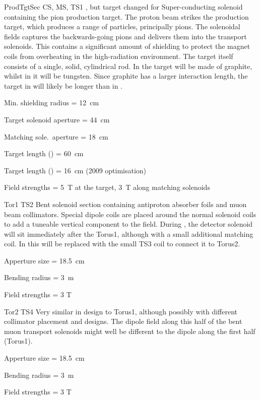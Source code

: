 {ProdTgtSec}
{CS, MS, TS1}
{\phaseI, but target changed for \phaseII}
{Super-conducting solenoid containing the pion production target.  The proton beam strikes the production target, which produces a range of particles, principally pions.  The solenoidal fields captures the backwards-going pions and delivers them into the transport solenoids.  This contains a significant amount of shielding to protect the magnet coils from overheating in the high-radiation environment.  The target itself consists of a single, solid, cylindrical rod.  In \phaseI the target will be made of graphite, whilst in \phaseII it will be tungsten. Since graphite has a larger interaction length, the target in \phaseI will likely be longer than in \phaseII.}
{\item Min. shielding radius = 12~cm%
 \item Target solenoid aperture = 44~cm%
 \item Matching sole.\ aperture = 18~cm%
 \item Target length (\phaseI) = 60~cm%
 \item Target length (\phaseII) = 16~cm (2009 optimisation)%
 \item Field strengths = 5~T at the target, 3~T along matching solenoids}

{Tor1}
{TS2}
{\phaseI }
{Bent solenoid section containing antiproton absorber foils and muon beam collimators.  Special dipole coils are placed around the normal solenoid coils to add a tuneable vertical component to the field.  During \phaseI, the detector solenoid will sit immediately after the Torus1, although with a small additional matching coil.  In \phaseII this will be replaced with the small TS3 coil to connect it to Torus2.}
{\item Apperture size = 18.5~cm
 \item Bending radius = 3~m 
\item Field strengths = 3 T}

{Tor2}
{TS4}
{\phaseII}
{Very similar in design to Torus1, although possibly with different collimator placement and designs. The dipole field along this half of the bent muon transport solenoids might well be different to the dipole along the first half (Torus1).}
{\item Apperture size = 18.5~cm
 \item Bending radius = 3~m
 \item Field strengths = 3 T}

